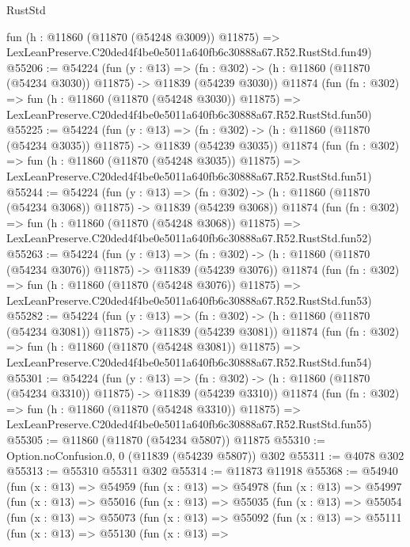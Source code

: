 \begin{lexlean}{RustStd}
\begin{coremodule}
    fun (h : @11860 (@11870 (@54248 @3009)) @11875) =>
    LexLeanPreserve.C20ded4f4be0e5011a640fb6c30888a67.R52.RustStd.fun49)
@55206 := @54224
    (fun (y : @13) =>
    (fn : @302) -> (h : @11860 (@11870 (@54234 @3030)) @11875) -> @11839 (@54239 @3030))
    @11874
    (fun (fn : @302) =>
    fun (h : @11860 (@11870 (@54248 @3030)) @11875) =>
    LexLeanPreserve.C20ded4f4be0e5011a640fb6c30888a67.R52.RustStd.fun50)
@55225 := @54224
    (fun (y : @13) =>
    (fn : @302) -> (h : @11860 (@11870 (@54234 @3035)) @11875) -> @11839 (@54239 @3035))
    @11874
    (fun (fn : @302) =>
    fun (h : @11860 (@11870 (@54248 @3035)) @11875) =>
    LexLeanPreserve.C20ded4f4be0e5011a640fb6c30888a67.R52.RustStd.fun51)
@55244 := @54224
    (fun (y : @13) =>
    (fn : @302) -> (h : @11860 (@11870 (@54234 @3068)) @11875) -> @11839 (@54239 @3068))
    @11874
    (fun (fn : @302) =>
    fun (h : @11860 (@11870 (@54248 @3068)) @11875) =>
    LexLeanPreserve.C20ded4f4be0e5011a640fb6c30888a67.R52.RustStd.fun52)
@55263 := @54224
    (fun (y : @13) =>
    (fn : @302) -> (h : @11860 (@11870 (@54234 @3076)) @11875) -> @11839 (@54239 @3076))
    @11874
    (fun (fn : @302) =>
    fun (h : @11860 (@11870 (@54248 @3076)) @11875) =>
    LexLeanPreserve.C20ded4f4be0e5011a640fb6c30888a67.R52.RustStd.fun53)
@55282 := @54224
    (fun (y : @13) =>
    (fn : @302) -> (h : @11860 (@11870 (@54234 @3081)) @11875) -> @11839 (@54239 @3081))
    @11874
    (fun (fn : @302) =>
    fun (h : @11860 (@11870 (@54248 @3081)) @11875) =>
    LexLeanPreserve.C20ded4f4be0e5011a640fb6c30888a67.R52.RustStd.fun54)
@55301 := @54224
    (fun (y : @13) =>
    (fn : @302) -> (h : @11860 (@11870 (@54234 @3310)) @11875) -> @11839 (@54239 @3310))
    @11874
    (fun (fn : @302) =>
    fun (h : @11860 (@11870 (@54248 @3310)) @11875) =>
    LexLeanPreserve.C20ded4f4be0e5011a640fb6c30888a67.R52.RustStd.fun55)
@55305 := @11860 (@11870 (@54234 @5807)) @11875
@55310 := Option.noConfusion.{0, 0} (@11839 (@54239 @5807)) @302
@55311 := @4078 @302
@55313 := @55310 @55311 @302
@55314 := @11873 @11918
@55368 := @54940
    (fun (x : @13) =>
    @54959
      (fun (x : @13) =>
      @54978
        (fun (x : @13) =>
        @54997
          (fun (x : @13) =>
          @55016
            (fun (x : @13) =>
            @55035
              (fun (x : @13) =>
              @55054
                (fun (x : @13) =>
                @55073
                  (fun (x : @13) =>
                  @55092
                    (fun (x : @13) =>
                    @55111
                      (fun (x : @13) =>
                      @55130
                        (fun (x : @13) =>

\end{coremodule}
\end{lexlean}
